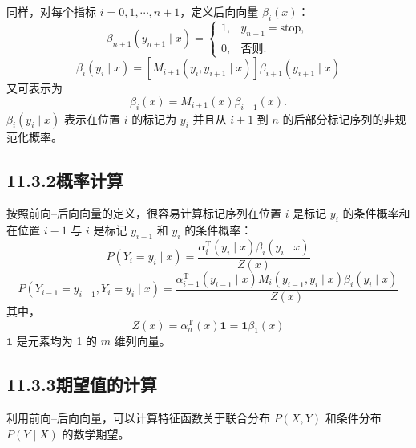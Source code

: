 \documentclass[UTF8,12pt,a4paper,fontset=fandol]{ctexart}
\begin{document}
同样，对每个指标 $i=0,1,\cdots,n+1$，定义后向向量 $\beta_i(x)$：
\begin{equation}
\beta_{n+1}(y_{n+1}\mid x)=
\begin{cases}
1, & y_{n+1}=\text{stop},\\
0, & \text{否则}.
\end{cases}
\tag{11.29}
\end{equation}
\begin{equation}
\beta_i(y_i\mid x)=[M_{i+1}(y_i,y_{i+1}\mid x)]\beta_{i+1}(y_{i+1}\mid x)
\tag{11.30}
\end{equation}
又可表示为
\begin{equation}
\beta_i(x)=M_{i+1}(x)\beta_{i+1}(x).
\tag{11.31}
\end{equation}
$\beta_i(y_i\mid x)$ 表示在位置 $i$ 的标记为 $y_i$ 并且从 $i+1$ 到 $n$ 的后部分标记序列的非规范化概率。

\subsection*{11.3.2\quad 概率计算}

按照前向--后向向量的定义，很容易计算标记序列在位置 $i$ 是标记 $y_i$ 的条件概率和在位置 $i-1$ 与 $i$ 是标记 $y_{i-1}$ 和 $y_i$ 的条件概率：
\begin{equation}
P(Y_i=y_i\mid x)=\frac{\alpha_i^{\mathrm T}(y_i\mid x)\beta_i(y_i\mid x)}{Z(x)}
\tag{11.32}
\end{equation}
\begin{equation}
P(Y_{i-1}=y_{i-1},Y_i=y_i\mid x)=
\frac{\alpha_{i-1}^{\mathrm T}(y_{i-1}\mid x)M_i(y_{i-1},y_i\mid x)\beta_i(y_i\mid x)}{Z(x)}
\tag{11.33}
\end{equation}
其中，
\[
Z(x)=\alpha_n^{\mathrm T}(x)\mathbf{1}=\mathbf{1}\beta_1(x)
\]
$\mathbf{1}$ 是元素均为 1 的 $m$ 维列向量。

\subsection*{11.3.3\quad 期望值的计算}

利用前向--后向向量，可以计算特征函数关于联合分布 $P(X,Y)$ 和条件分布 $P(Y\mid X)$ 的数学期望。
\end{document}

